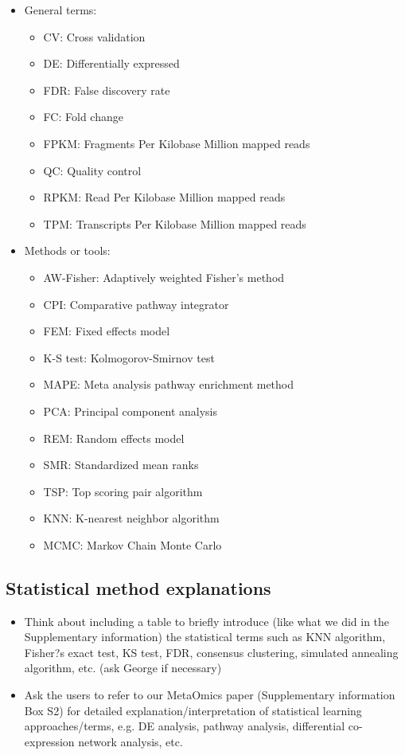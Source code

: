 \begin{itemize}
\item General terms:
\begin{itemize}
\item CV: Cross validation
\item DE:  Differentially expressed
\item FDR: False discovery rate
\item FC: Fold change
\item FPKM: Fragments Per Kilobase Million mapped reads
\item QC: Quality control
\item RPKM: Read Per Kilobase Million mapped reads
\item TPM: Transcripts Per Kilobase Million mapped reads
\end{itemize}

\item Methods or tools:
\begin{itemize}
\item AW-Fisher: Adaptively weighted Fisher's method
\item CPI: Comparative pathway integrator 
\item FEM: Fixed effects model
\item K-S test: Kolmogorov-Smirnov test
\item MAPE: Meta analysis pathway enrichment method
\item PCA: Principal component analysis
\item REM: Random effects model
\item SMR: Standardized mean ranks
\item TSP: Top scoring pair algorithm
\item KNN: K-nearest neighbor algorithm
\item MCMC: Markov Chain Monte Carlo

\end{itemize}

\end{itemize}

\subsection{Statistical method explanations}

{\color{red}
\begin{itemize}
\item
Think about including a table to briefly introduce (like what we did in the Supplementary information) the statistical terms such as KNN algorithm, 
Fisher?s exact test, KS test, FDR, consensus clustering, simulated annealing algorithm, etc. (ask George if necessary)
\item
Ask the users to refer to our MetaOmics paper (Supplementary information Box S2) for detailed explanation/interpretation of statistical learning approaches/terms, e.g. DE analysis, pathway analysis, differential co-expression network analysis, etc.
\end{itemize}

}

